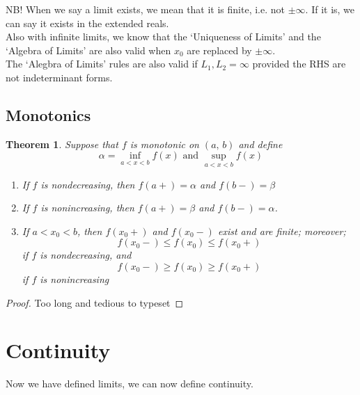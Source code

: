 \documentclass{article}
\renewcommand{\a}{\alpha}
\renewcommand{\b}{\beta}
\theoremstyle{mythmstyle}
\newtheorem{theorem}{Theorem}[subsection]
\newtheorem{definition}{Definition}[subsection]
\begin{document}
NB! When we say a limit exists, we mean that it is finite, i.e. not $\pm\infty$. If it is, we can say it exists in the extended reals.\\

Also with infinite limits, we know that the `Uniqueness of Limits' and the `Algebra of Limits' are also valid when $x_0$ are replaced by $\pm\infty$.\\

The `Alegbra of Limits' rules are also valid if $L_1,L_2 = \infty$ provided the RHS are not indeterminant forms.

\subsection{Monotonics}
\noindent{}\vspace{10pt}

\begin{theorem}
  Suppose that $f$ is monotonic on $(a,\, b)$ and define
  $$ \a = \inf_{a<x<b}{f(x)} \text{ and } \sup_{a<x<b}{f(x)} $$
  \begin{enumerate}
    \item If $f$ is nondecreasing, then $f(a+)=\a$ and $f(b-)=\b$
    \item If $f$ is nonincreasing, then $f(a+)=\b$ and $f(b-)=\a$.
    \item If $a<x_0<b$, then $f(x_0+)$ and $f(x_0-)$ exist and are finite; moreover;
    $$ f(x_0-) \le f(x_0) \le f(x_0+) $$
    if $f$ is nondecreasing, and
    $$ f(x_0-)\ge f(x_0) \ge f(x_0+) $$
    if $f$ is nonincreasing
  \end{enumerate}
\end{theorem}
\begin{proof}
  Too long and tedious to typeset
\end{proof}

\section{Continuity}
Now we have defined limits, we can now define continuity.\\
\end{document}
